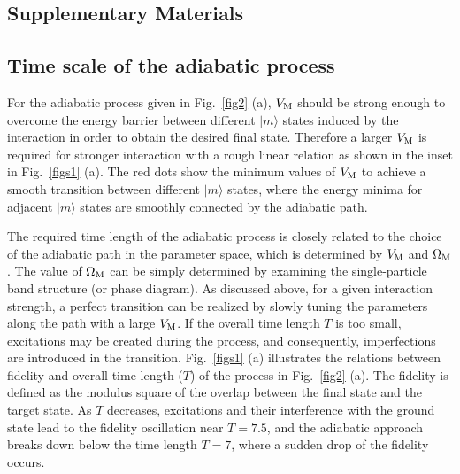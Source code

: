 \documentclass[twocolumn,prl,floatfix,citeautoscript,nofootinbib]{revtex4-1}
\begin{document}
\begin{appendix}
\section{Supplementary Materials}
\subsection{Time scale of the adiabatic process}
For the adiabatic process
given in Fig.~\ref{fig2} (a),
$V_{\rm{M}}$ should be strong enough to overcome the energy barrier
between different $|m \rangle$ states induced by the interaction in order to obtain the desired final state.
Therefore a larger $V_{\rm{M}}$ is required for stronger interaction with a rough linear relation
as shown in the inset in Fig.~\ref{figs1} (a).
The red dots show the minimum values of $V_{\rm{M}}$ to achieve a smooth transition between different $|m \rangle$ states,
where the energy minima for
adjacent $|m \rangle$ states are smoothly
connected by the adiabatic path.


The required time length of the adiabatic process
is closely related to the choice of the
adiabatic path in the parameter space, which is determined by
$V_{\rm{M}}$ and $\Omega_{\rm{M}}$.
The value of $\Omega_{\rm{M}}$ can be simply
determined by examining the single-particle band structure (or phase diagram).
As discussed above, for a given interaction strength,
a perfect transition can be realized by slowly tuning the parameters along the path with a large $V_{\rm{M}}$.
If the overall time length $T$ is too small, excitations may be created during the process,
and consequently, imperfections are introduced in the transition.
Fig.~\ref{figs1} (a) illustrates the relations between fidelity and overall time length ($T$) of the process
in Fig.~\ref{fig2} (a).
The fidelity is defined as the modulus square of the overlap between the final state
and the target state.
As $T$ decreases, excitations and their interference
with the ground state lead to the fidelity oscillation near $T=7.5$, and
the adiabatic approach breaks down below the time length $T=7$, where a sudden drop of the fidelity occurs.


\end{appendix}
\end{document}
